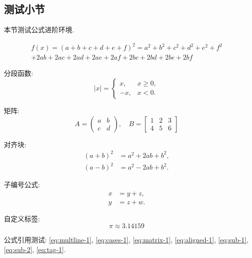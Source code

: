 \subsection{测试小节}

本节测试公式进阶环境.

\begin{multline}
    f(x) = (a+b+c+d+e+f)^2 = a^2 + b^2 + c^2 + d^2 + e^2 + f^2 \\
    + 2ab + 2ac + 2ad + 2ae + 2af + 2bc + 2bd + 2be + 2bf
    \label{eq:multline-1}
\end{multline}

分段函数:
\begin{equation}
    |x| =
    \begin{cases}
        x, & x \geq 0, \\
        -x, & x < 0.
    \end{cases}
    \label{eq:cases-1}
\end{equation}

矩阵:
\begin{equation}
    A = \begin{pmatrix}
        a & b \\
        c & d
    \end{pmatrix},
    \quad
    B = \begin{bmatrix}
        1 & 2 & 3 \\
        4 & 5 & 6
    \end{bmatrix}
    \label{eq:matrix-1}
\end{equation}

对齐块:
\begin{equation}
    \begin{aligned}
        (a+b)^2 &= a^2 + 2ab + b^2, \\
        (a-b)^2 &= a^2 - 2ab + b^2.
    \end{aligned}
    \label{eq:aligned-1}
\end{equation}

子编号公式:
\begin{subequations}
    \begin{align}
        x &= y + z, \label{eq:sub-1} \\
        y &= z + w. \label{eq:sub-2}
    \end{align}
\end{subequations}

自定义标签:
\begin{equation}
    \pi \approx 3.14159 \tag{$\ast$}
    \label{eq:tag-1}
\end{equation}

公式引用测试: \eqref{eq:multline-1}, \eqref{eq:cases-1}, \eqref{eq:matrix-1}, \eqref{eq:aligned-1}, \eqref{eq:sub-1}, \eqref{eq:sub-2}, \eqref{eq:tag-1}.
